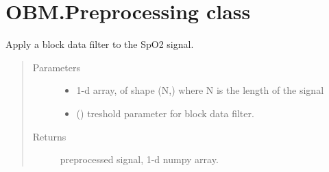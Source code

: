 \documentclass[letterpaper,10pt,english]{sphinxmanual}
\begin{document}
\section{OBM.Preprocessing class}
\label{\detokenize{OBM:module-OBM.Preprocessing}}\label{\detokenize{OBM:obm-preprocessing-class}}

\begin{fulllineitems}
\label{\detokenize{OBM:OBM.Preprocessing.block_data}}
Apply a block data filter to the SpO2 signal.
\begin{quote}\begin{description}
\item[{Parameters}] \leavevmode\begin{itemize}
\item {} 
 \textendash{} 1-d array, of shape (N,) where N is the length of the signal

\item {} 
\sphinxstyleliteralstrong{\sphinxupquote{(}}\sphinxstyleliteralstrong{\sphinxupquote{)}} () \textendash{} treshold parameter for block data filter.

\end{itemize}

\item[{Returns}] \leavevmode
preprocessed signal, 1-d numpy array.

\end{description}\end{quote}

\end{fulllineitems}

\end{document}
